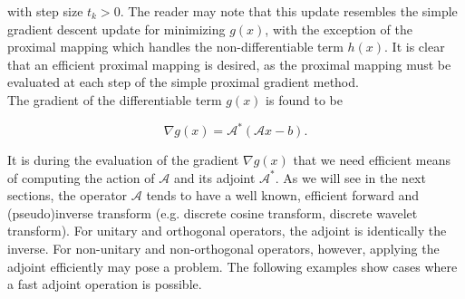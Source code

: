 \documentclass[journal]{IEEEtran}
\begin{document}
\noindent with step size $t_k>0$.  The reader may note that this update resembles the simple gradient descent update for minimizing $g(x)$, with the exception of the proximal mapping which handles the non-differentiable term $h(x)$.  It is clear that an efficient proximal mapping is desired, as the proximal mapping must be evaluated at each step of the simple proximal gradient method.\\

The gradient of the differentiable term $g(x)$ is found to be

\[ \nabla g(x) = \mathcal{A}^\ast(\mathcal{A}x-b). \] 

\noindent It is during the evaluation of the gradient $\nabla g(x)$ that we need efficient means of computing the action of $\mathcal{A}$ and its adjoint $\mathcal{A}^\ast$.  As we will see in the next sections, the operator $\mathcal{A}$ tends to have a well known, efficient forward and (pseudo)inverse transform (e.g. discrete cosine transform, discrete wavelet transform).  For unitary and orthogonal operators, the adjoint is identically the inverse.  For non-unitary and non-orthogonal operators, however, applying the adjoint efficiently may pose a problem.  The following examples show cases where a fast adjoint operation is possible.

\end{document}
